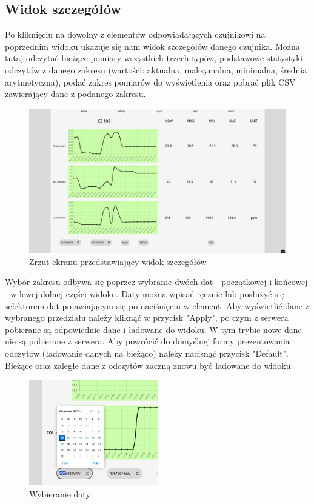 \subsection{Widok szczegółów}

Po kliknięciu na dowolny z elementów odpowiadających czujnikowi na poprzednim widoku ukazuje się nam widok szczegółów danego czujnika. Można tutaj odczytać
bieżące pomiary wszystkich trzech typów, podstawowe statystyki odczytów z danego zakresu (wartości: aktualna, maksymalna, minimalna, średnia arytmetyczna), 
podać zakres pomiarów do wyświetlenia oraz pobrać plik CSV zawierający dane z podanego zakresu.

\begin{figure}[H]
    \includegraphics[width=\textwidth]{zdj/app/details.png}
    \caption{Zrzut ekranu przedstawiający widok szczegółów}
\end{figure}

Wybór zakresu odbywa się poprzez wybranie dwóch dat - początkowej i końcowej - w lewej dolnej części widoku. Daty można wpisać ręcznie lub posłużyć się
selektorem dat pojawiającym się po naciśnięciu w element. Aby wyświetlić dane z wybranego przedziału należy kliknąć w przycisk "Apply", po czym z serwera pobierane
są odpowiednie dane i ładowane do widoku. W tym trybie nowe dane nie są pobierane z serwera. 
Aby powrócić do domyślnej formy prezentowania odczytów (ładowanie danych na bieżąco) należy nacisnąć przycisk "Default". Bieżące oraz zaległe dane z odczytów
zaczną znowu być ładowane do widoku.

\begin{figure}[H]
    \centering
    \includegraphics[width=0.5\textwidth]{zdj/app/date-pick.png}
    \caption{Wybieranie daty}
\end{figure}

